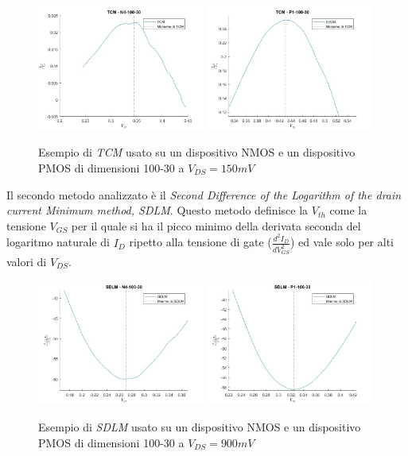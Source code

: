 \documentclass[12pt, letterpaper]{book}
\begin{document}
\begin{figure}[h!]
\centering
 \includegraphics[width=0.49\textwidth]{TCM-N4-100-30-NoFit}
 \includegraphics[width=0.49\textwidth]{TCM-P1-100-30-NoFit}
 \caption{Esempio di \emph{TCM} usato su un dispositivo NMOS e un dispositivo PMOS di dimensioni 100-30 a $V_{DS} = 150 mV$}
\end{figure}

Il secondo metodo analizzato è il \emph{Second Difference of the Logarithm of the drain current Minimum method, SDLM}. Questo metodo definisce la $V_{th}$ come la tensione $V_{GS}$ per il quale si ha il picco minimo della derivata seconda del logaritmo naturale di $I_D$ ripetto alla tensione di gate ($\frac{d^2I_D}{dV_{GS}^2}$) ed vale solo per alti valori di $V_{DS}$. \\

\begin{figure}[h!]
\centering
 \includegraphics[width=0.49\textwidth]{SDLM-N4-100-30-NoFit}
 \includegraphics[width=0.49\textwidth]{SDLM-P1-100-30-NoFit}
 \caption{Esempio di \emph{SDLM} usato su un dispositivo NMOS e un dispositivo PMOS di dimensioni 100-30 a $V_{DS} = 900 mV$}
\end{figure}
\end{document}
